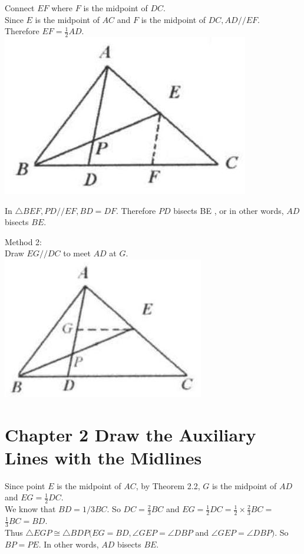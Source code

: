 \documentclass[10pt]{article}
\begin{document}
Connect \(E F\) where \(F\) is the midpoint of \(D C\).\\
Since \(E\) is the midpoint of \(A C\) and \(F\) is the midpoint of \(D C, A D / / E F\).\\
Therefore \(E F=\frac{1}{2} A D\).\\
\includegraphics[max width=\textwidth, center]{2025_04_17_97bc1f7e44d93c271a88g-036}

In \(\triangle B E F, P D / / E F, B D=D F\). Therefore \(P D\) bisects BE , or in other words, \(A D\) bisects \(B E\).

Method 2:\\
Draw \(E G / / D C\) to meet \(A D\) at \(G\).\\
\includegraphics[max width=\textwidth, center]{2025_04_17_97bc1f7e44d93c271a88g-036(3)}

\section*{Chapter 2 Draw the Auxiliary Lines with the Midlines}
Since point \(E\) is the midpoint of \(A C\), by Theorem 2.2, \(G\) is the midpoint of \(A D\) and \(E G=\frac{1}{2} D C\).\\
We know that \(B D=1 / 3 B C\). So \(D C=\frac{2}{3} B C\) and \(E G=\frac{1}{2} D C=\frac{1}{2} \times \frac{2}{3} B C=\) \(\frac{1}{3} B C=B D\).\\
Thus \(\triangle E G P \cong \triangle B D P(E G=B D, \angle G E P=\angle D B P\) and \(\angle G E P=\angle D B P)\). So \(B P=P E\). In other words, \(A D\) bisects \(B E\).
\end{document}
